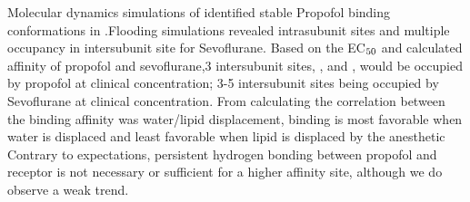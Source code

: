 \documentclass{biophys}
\begin{document}
Molecular dynamics simulations of \Ps identified stable Propofol binding conformations in \GABAA.Flooding simulations revealed intrasubunit sites and multiple occupancy in intersubunit site for Sevoflurane. Based on the EC$\textsubscript{50}$ and calculated affinity of propofol and sevoflurane,3 intersubunit sites, \ab, \gb and \gba, would be occupied by propofol at clinical concentration; 3-5 intersubunit sites being occupied by Sevoflurane at clinical concentration. From calculating the correlation between the binding affinity was water/lipid displacement, binding is most favorable when water is displaced and least favorable when lipid is displaced by the anesthetic
Contrary to expectations, persistent hydrogen bonding between propofol and receptor is not necessary or sufficient for a higher affinity site, although we do observe a weak trend.
\end{document}

